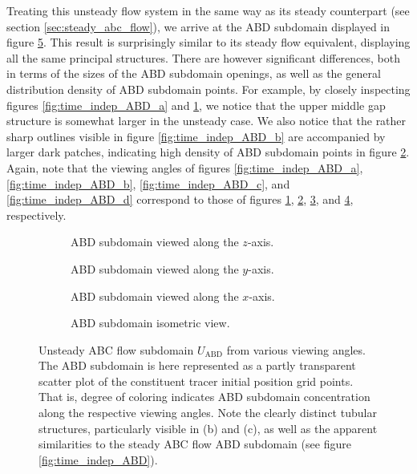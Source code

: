 Treating this unsteady flow system in the same way as its steady counterpart (see section \ref{sec:steady_abc_flow}), we arrive at the ABD subdomain displayed in figure \ref{fig:time_dep_ABD}. This result is surprisingly similar to its steady flow equivalent, displaying all the same principal structures. There are however significant differences, both in terms of the sizes of the ABD subdomain openings, as well as the general distribution density of ABD subdomain points. For example, by closely inspecting figures \ref{fig:time_indep_ABD_a} and \ref{fig:time_dep_ABD_a}, we notice that the upper middle gap structure is somewhat larger in the unsteady case. We also notice that the rather sharp outlines visible in figure \ref{fig:time_indep_ABD_b} are accompanied by larger dark patches, indicating high density of ABD subdomain points in figure \ref{fig:time_dep_ABD_b}. Again, note that the viewing angles of figures \ref{fig:time_indep_ABD_a}, \ref{fig:time_indep_ABD_b}, \ref{fig:time_indep_ABD_c}, and \ref{fig:time_indep_ABD_d} correspond to those of figures \ref{fig:time_dep_ABD_a}, \ref{fig:time_dep_ABD_b}, \ref{fig:time_dep_ABD_c}, and \ref{fig:time_dep_ABD_d}, respectively.

\begin{figure}[h!]

\centering
\begin{subfigure}[b]{0.45\textwidth}
\centering

\caption{ABD subdomain viewed along the $z$-axis.}\label{fig:time_dep_ABD_a}
\end{subfigure}
\begin{subfigure}[b]{0.45\textwidth}
\centering

\caption{ABD subdomain viewed along the $y$-axis.}\label{fig:time_dep_ABD_b}
\end{subfigure}
\begin{subfigure}[b]{0.45\textwidth}
\centering

\caption{ABD subdomain viewed along the $x$-axis.}\label{fig:time_dep_ABD_c}
\end{subfigure}
\begin{subfigure}[b]{0.45\textwidth}
\centering

\caption{ABD subdomain isometric view.}\label{fig:time_dep_ABD_d}
\end{subfigure}

\caption{Unsteady ABC flow subdomain $U_{\text{ABD}}$ from various viewing angles. The ABD subdomain is here represented as a partly transparent scatter plot of the constituent tracer initial position grid points. That is, degree of coloring indicates ABD subdomain concentration along the respective viewing angles. Note the clearly distinct tubular structures, particularly visible in (b) and (c), as well as the apparent similarities to the steady ABC flow ABD subdomain (see figure \ref{fig:time_indep_ABD}).}\label{fig:time_dep_ABD}
\end{figure}

